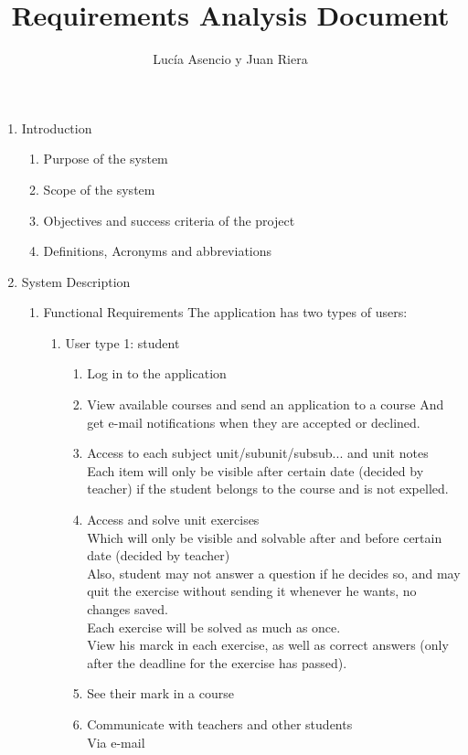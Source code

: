 \documentclass{article}
\title{Requirements Analysis Document}
\author{Lucía Asencio y Juan Riera}
\begin{document}
\maketitle
\begin{enumerate}
	\item{Introduction}
	\begin{enumerate}
		\item{Purpose of the system}
		\item{Scope of the system}
		\item{Objectives and success criteria of the project}
		\item{Definitions, Acronyms and abbreviations}
	\end{enumerate}
	
	\item{System Description}
	\begin{enumerate}
		\item{Functional Requirements}
		The application has two types of users:
		\begin{enumerate}
			\item User type 1: student
			\begin{enumerate}
				\item Log in to the application\\
				\item View available courses and send an application to a course
				And get e-mail notifications when they are accepted or declined.\\
				\item Access to each subject unit/subunit/subsub... and unit notes\\
				Each item will only be visible after certain date (decided by teacher) if the student belongs to the course and is not expelled.\\
				\item Access and solve unit exercises \\
				Which will only be visible and solvable after and before certain date (decided by teacher) \\
				Also, student may not answer a question if he decides so, and may quit the exercise without sending it whenever he wants, no changes saved.\\
				Each exercise will be solved as much as once. \\
				View his marck in each exercise, as well as correct answers (only after the deadline for the exercise has passed).\\
				\item See their mark in a course
				\item Communicate with teachers and other students\\
				Via e-mail		\\
				

\end{enumerate}
\end{enumerate}
\end{enumerate}
\end{enumerate}
\end{document}
